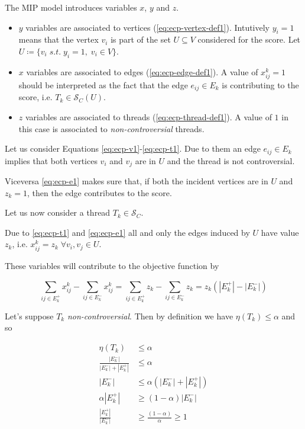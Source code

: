 The \acrshort{MIP} model introduces variables $x$, $y$ and $z$.
\begin{itemize}
	\item $y$ variables are associated to vertices
	      (\autoref{eq:ecp-vertex-def1}). Intutively $y_i = 1$ means that the
	      vertex $v_{i} $ is part of the set $U \subseteq V$ considered for the
	      score. Let $U \coloneqq \{ v_{i} \; s.t. \; y_{i} = 1, \;
		      v_{i} \in V \}$.
	\item $x$ variables are associated to edges (\autoref{eq:ecp-edge-def1}).
	      A value of $x_{ij}^{k} = 1$ should be interpreted as the fact that
	      the edge $e_{ij} \in E_k$ is contributing to the score,
	      i.e. $T_k \in \mathcal{S}_{C} (U)$.
	\item $z$ variables are associated to threads
	      (\autoref{eq:ecp-thread-def1}). A value of $1$ in this case
	      is associated to \emph{non-controversial} threads.
\end{itemize}

Let us consider Equations \ref{eq:ecp-v1}-\ref{eq:ecp-t1}. Due to them an
edge $e_{ij} \in E_k $ implies that
both vertices $v_{i} $ and $v_{j} $ are in $U$ and the thread is not controversial.

Viceversa \autoref{eq:ecp-e1} makes sure that, if both the incident vertices
are in $U$ and $z_{k} = 1$, then the edge contributes to the score.

Let us now consider a thread $T_k \in \mathcal{S}_{C} $.

Due to \autoref{eq:ecp-t1} and \autoref{eq:ecp-e1} all and only the edges
induced by $U$ have value $z_{k} $, i.e. $x_{ij}^{k} = z_k \; \forall v_{i}, v_{j}
	\in U$.

These variables will contribute to the objective function by

\begin{equation}
	\label{eq:ecp-thread-contribution}
	\sum^{}_{ij \in E^{+}_k } x_{ij} ^{k} - \sum_{ij \in E^{-} _k}
	x_{ij} ^{k} = \sum^{}_{ij \in E^{+} _k} z_k - \sum_{ij \in E^{-} _k}
	z_k = z_k (|E^{+} _k| - |E^{-} _k|)
\end{equation}

Let's suppose $T_k$ \emph{non-controversial}. Then by definition we have
$\eta(T_k) \leq \alpha $ and so

\begin{align}
	\eta(T_k)                                  & \leq \alpha        \\
	\frac{|E^{-} _k|}{|E^{-} _k| + |E^{+} _k|} & \leq \alpha        \\
	{|E^{-} _k|}                               & \leq \alpha(|E^{-}
	_k| + |E^{+} _k|)                                               \\
	\alpha {|E^{+} _k|}                        & \geq (1 -
	\alpha ) |E^{-} _k|                                             \\
	\frac{{|E^{+} _k|}}{|E^{-} _k|}
	                                           & \geq \frac{(1 -
		\alpha )}{\alpha } \geq 1
\end{align}

